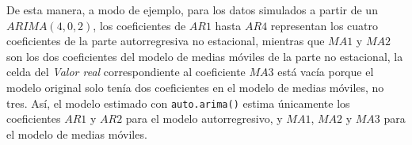 \documentclass[
]{article}
\begin{document}
De esta manera, a modo de ejemplo, para los datos simulados a partir de
un \(ARIMA(4,0,2)\), los coeficientes de \(AR1\) hasta \(AR4\)
representan los cuatro coeficientes de la parte autorregresiva no
estacional, mientras que \(MA1\) y \(MA2\) son los dos coeficientes del
modelo de medias móviles de la parte no estacional, la celda del
\emph{Valor real} correspondiente al coeficiente \(MA3\) está vacía
porque el modelo original solo tenía dos coeficientes en el modelo de
medias móviles, no tres. Así, el modelo estimado con
\texttt{auto.arima()} estima únicamente los coeficientes \(AR1\) y
\(AR2\) para el modelo autorregresivo, y \(MA1\), \(MA2\) y \(MA3\) para
el modelo de medias móviles.

\begin{table}[!h]

\caption{\label{tab:unnamed-chunk-20}\label{tab:coeficientes_original_autoarima}Coefcientes del proceso original y los estimados con auto.arima()}
\centering
{}
\end{table}
\end{document}
